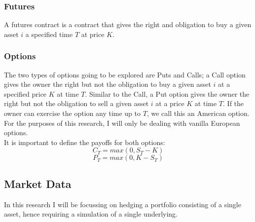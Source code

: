 \documentclass[12pt]{article}
\numberwithin{equation}{section}
\begin{document}
\subsubsection{Futures}
A futures contract is a contract that gives the right and obligation to buy a 
given asset $i$ a specified time $T$ at price $K$. 
\subsubsection{Options}
The two types of options going to be explored are Puts and Calls; a Call option 
gives the owner the right but not the obligation to buy a given asset $i$ at 
a specified price $K$ at time $T$. Similar to the Call, a Put option gives the 
owner the right but not the obligation to sell a given asset $i$ at a price $K$ 
at time $T$. If the owner can exercise the option any time up to $T$, we call 
this an American option. For the purposes of this research, I will only be 
dealing with vanilla European options.\\ 
It is important to define the payoffs for both options: 
\begin{equation}
C_T = max(0,S_T-K)
\end{equation}
\begin{equation}
P_T = max(0,K-S_T)
\end{equation}



\subsection{Market Data}
In this research I will be focussing on hedging a portfolio consisting of a single 
asset, hence requiring a simulation of a single underlying. 
\end{document}
